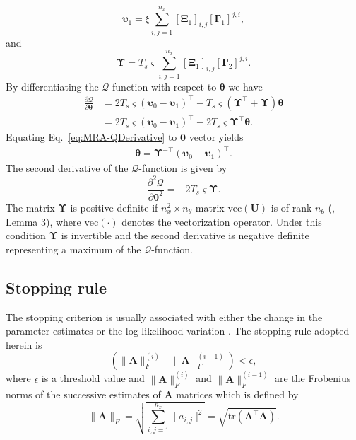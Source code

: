 \documentclass[review,authoryear,3p]{elsarticle}
\begin{document}
\begin{equation}\label{eq:epsilon1}
\boldsymbol\upsilon_1=\xi\sum_{i,j=1}^{n_x}[\boldsymbol\Xi_1]_{i,j}[\boldsymbol\Gamma_1]^{j,i},
\end{equation}                                                                                 
and
\begin{equation}\label{eq:Epsilon}
\boldsymbol\Upsilon=T_s\varsigma\sum_{i,j=1}^{n_x}[\boldsymbol\Xi_1]_{i,j}[\boldsymbol\Gamma_2]^{j,i}.
\end{equation}
By differentiating the $\mathcal Q$-function with respect to $\boldsymbol\theta$ we have
\begin{align}\label{eq:MRA-QDerivative}
\frac{\partial \mathcal Q}{\partial \boldsymbol\theta}&=2T_s\varsigma(\boldsymbol\upsilon_0-\boldsymbol\upsilon_1)^\top-T_s\varsigma(\boldsymbol\Upsilon^\top+\boldsymbol\Upsilon)\boldsymbol\theta \nonumber \\
&=2T_s\varsigma(\boldsymbol\upsilon_0-\boldsymbol\upsilon_1)^\top-2T_s\varsigma\boldsymbol\Upsilon^\top\boldsymbol\theta.
\end{align}
Equating Eq.~\eqref{eq:MRA-QDerivative} to $\mathbf 0$ vector yields
\begin{align}\label{eq:MRA-thetahat}
\boldsymbol \theta= \boldsymbol\Upsilon^{-\top}(\boldsymbol\upsilon_0-\boldsymbol\upsilon_1)^\top.
\end{align}
The second derivative of the $\mathcal Q$-function is given by
\begin{equation}
\frac{\partial^2\mathcal Q}{\partial\boldsymbol\theta^2}=-2T_s\varsigma\boldsymbol\Upsilon.
\end{equation}
The matrix $\boldsymbol\Upsilon$ is positive definite if $n_x^2\times n_{\theta}$ matrix $\mathrm{vec}(\mathbf U)$ is of rank $n_{\theta}$ (\citep{Dewar2009}, Lemma 3), where $\mathrm{vec}(\cdot)$ denotes the vectorization operator. Under this condition $\boldsymbol\Upsilon$ is  invertible and the second derivative is negative definite representing a maximum of the $\mathcal Q$-function. 

\subsection{Stopping rule}
The stopping criterion is usually associated with either the change in the parameter estimates or the log-likelihood variation \cite{McLachlan1997}. The stopping rule adopted herein is
\begin{equation}
 \left(\parallel \mathbf{A} \parallel_{F}^{(i)}-\parallel \mathbf{A} \parallel_{F}^{(i-1)}\right)<\epsilon,
 \end{equation}
 where $\epsilon$ is a threshold value and $\parallel \mathbf{A} \parallel_{F}^{(i)}$ and $ \parallel \mathbf{A} \parallel_{F}^{(i-1)}$ are the Frobenius norms  of the successive estimates of $\mathbf{A} $ matrices which is defined by \citet{Meyer2000}
 \begin{equation}
  \parallel \mathbf{A} \parallel_{F}=\sqrt{\sum_{i,j=1}^{n_x}\mid a_{i,j} \mid^2}=\sqrt{\mathrm{tr} (\mathbf A^{\top}\mathbf A)}.
 \end{equation}
\end{document}
